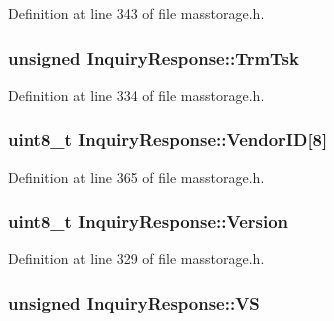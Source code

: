\-Definition at line 343 of file masstorage.\-h.

\hypertarget{struct_inquiry_response_add4ccc2e5f626d29a24e5f38149a2e76}{
\subsubsection[{\-Trm\-Tsk}]{\setlength{\rightskip}{0pt plus 5cm}unsigned {\bf \-Inquiry\-Response\-::\-Trm\-Tsk}}}\label{struct_inquiry_response_add4ccc2e5f626d29a24e5f38149a2e76}


\-Definition at line 334 of file masstorage.\-h.

\hypertarget{struct_inquiry_response_acc610ff84bef225f8826585725ad9802}{
\subsubsection[{\-Vendor\-I\-D}]{\setlength{\rightskip}{0pt plus 5cm}uint8\-\_\-t {\bf \-Inquiry\-Response\-::\-Vendor\-I\-D}\mbox{[}8\mbox{]}}}\label{struct_inquiry_response_acc610ff84bef225f8826585725ad9802}


\-Definition at line 365 of file masstorage.\-h.

\hypertarget{struct_inquiry_response_a86832a5def98c1e21447497177a8cc3a}{
\subsubsection[{\-Version}]{\setlength{\rightskip}{0pt plus 5cm}uint8\-\_\-t {\bf \-Inquiry\-Response\-::\-Version}}}\label{struct_inquiry_response_a86832a5def98c1e21447497177a8cc3a}


\-Definition at line 329 of file masstorage.\-h.

\hypertarget{struct_inquiry_response_a9a6c47a45be5bd1ce230c9fac3cc9bbd}{
\subsubsection[{\-V\-S}]{\setlength{\rightskip}{0pt plus 5cm}unsigned {\bf \-Inquiry\-Response\-::\-V\-S}}}\label{struct_inquiry_response_a9a6c47a45be5bd1ce230c9fac3cc9bbd}


